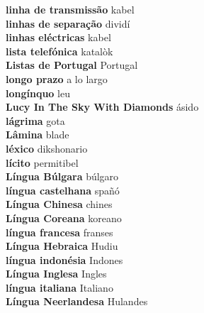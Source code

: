 \textbf{ linha de transmissão  } kabel \\
\textbf{ linhas de separação  } dividí \\
\textbf{ linhas eléctricas  } kabel \\
\textbf{ lista telefónica  } katalòk \\
\textbf{ Listas de Portugal  } Portugal \\
\textbf{ longo prazo  } a lo largo \\
\textbf{ longínquo  } leu \\
\textbf{ Lucy In The Sky With Diamonds  } ásido \\
\textbf{ lágrima  } gota \\
\textbf{ Lâmina  } blade \\
\textbf{ léxico  } dikshonario \\
\textbf{ lícito  } permitibel \\
\textbf{ Língua Búlgara  } búlgaro \\
\textbf{ língua castelhana  } spañó \\
\textbf{ Língua Chinesa  } chines \\
\textbf{ Língua Coreana  } koreano \\
\textbf{ língua francesa  } franses \\
\textbf{ Língua Hebraica  } Hudiu \\
\textbf{ língua indonésia  } Indones \\
\textbf{ Língua Inglesa  } Ingles \\
\textbf{ língua italiana  } Italiano \\
\textbf{ Língua Neerlandesa  } Hulandes \\
